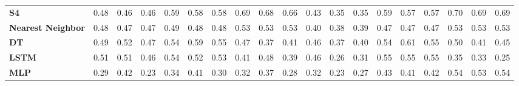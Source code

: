 \begin{table}[t]
{\begin{tabular}{l ccc ccc ccc ccc ccc ccc}
\textbf{S4} & \cellcolor[HTML]{FFCD3E}0.48 & \cellcolor[HTML]{FFC442}0.46 & \cellcolor[HTML]{FFC442}0.46 & \cellcolor[HTML]{BDD24B}0.59 & \cellcolor[HTML]{C5D249}0.58 & \cellcolor[HTML]{C4D24A}0.58 & \cellcolor[HTML]{7BD05C}0.69 & \cellcolor[HTML]{82D05A}0.68 & \cellcolor[HTML]{92D156}0.66 & \cellcolor[HTML]{FFB649}0.43 & \cellcolor[HTML]{FF9458}0.35 & \cellcolor[HTML]{FF9558}0.35 & \cellcolor[HTML]{C4D24A}0.59 & \cellcolor[HTML]{D2D346}0.57 & \cellcolor[HTML]{D1D346}0.57 & \cellcolor[HTML]{75D05D}0.70 & \cellcolor[HTML]{78D05C}0.69 & \cellcolor[HTML]{79D05C}0.69 \\
\textbf{Nearest Neighbor} & \cellcolor[HTML]{FFCA3F}0.48 & \cellcolor[HTML]{FFC741}0.47 & \cellcolor[HTML]{FFC840}0.47 & \cellcolor[HTML]{FFCF3D}0.49 & \cellcolor[HTML]{FFCD3E}0.48 & \cellcolor[HTML]{FFCD3E}0.48 & \cellcolor[HTML]{EAD340}0.53 & \cellcolor[HTML]{E9D340}0.53 & \cellcolor[HTML]{ECD340}0.53 & \cellcolor[HTML]{FFA84F}0.40 & \cellcolor[HTML]{FFA252}0.38 & \cellcolor[HTML]{FFA451}0.39 & \cellcolor[HTML]{FFC641}0.47 & \cellcolor[HTML]{FFC841}0.47 & \cellcolor[HTML]{FFC542}0.47 & \cellcolor[HTML]{EAD340}0.53 & \cellcolor[HTML]{E8D341}0.53 & \cellcolor[HTML]{EBD340}0.53 \\
\textbf{DT} & \cellcolor[HTML]{FFCF3D}0.49 & \cellcolor[HTML]{F2D43E}0.52 & \cellcolor[HTML]{FFC840}0.47 & \cellcolor[HTML]{E1D343}0.54 & \cellcolor[HTML]{BED24B}0.59 & \cellcolor[HTML]{DDD343}0.55 & \cellcolor[HTML]{FFC840}0.47 & \cellcolor[HTML]{FF9D54}0.37 & \cellcolor[HTML]{FFAD4D}0.41 & \cellcolor[HTML]{FFC542}0.46 & \cellcolor[HTML]{FF9D54}0.37 & \cellcolor[HTML]{FFA94F}0.40 & \cellcolor[HTML]{E5D341}0.54 & \cellcolor[HTML]{B3D24E}0.61 & \cellcolor[HTML]{DDD343}0.55 & \cellcolor[HTML]{FED43B}0.50 & \cellcolor[HTML]{FFB04B}0.41 & \cellcolor[HTML]{FFBF45}0.45 \\
\textbf{LSTM} & \cellcolor[HTML]{F6D43D}0.51 & \cellcolor[HTML]{F8D43D}0.51 & \cellcolor[HTML]{FFC442}0.46 & \cellcolor[HTML]{E6D341}0.54 & \cellcolor[HTML]{EED43F}0.52 & \cellcolor[HTML]{EDD33F}0.53 & \cellcolor[HTML]{FFAF4C}0.41 & \cellcolor[HTML]{FFCC3F}0.48 & \cellcolor[HTML]{FFA550}0.39 & \cellcolor[HTML]{FFC343}0.46 & \cellcolor[HTML]{FF7069}0.26 & \cellcolor[HTML]{FF855F}0.31 & \cellcolor[HTML]{DAD344}0.55 & \cellcolor[HTML]{DBD344}0.55 & \cellcolor[HTML]{E0D343}0.55 & \cellcolor[HTML]{FF9458}0.35 & \cellcolor[HTML]{FF8F5B}0.33 & \cellcolor[HTML]{FF6C6A}0.25 \\
\textbf{MLP} & \cellcolor[HTML]{FF7A64}0.29 & \cellcolor[HTML]{FFB24A}0.42 & \cellcolor[HTML]{FF6B6B}0.23 & \cellcolor[HTML]{FF905A}0.34 & \cellcolor[HTML]{FFAF4C}0.41 & \cellcolor[HTML]{FF7F62}0.30 & \cellcolor[HTML]{FF875E}0.32 & \cellcolor[HTML]{FF9F53}0.37 & \cellcolor[HTML]{FF7766}0.28 & \cellcolor[HTML]{FF865F}0.32 & \cellcolor[HTML]{FF6B6B}0.23 & \cellcolor[HTML]{FF7268}0.27 & \cellcolor[HTML]{FFB748}0.43 & \cellcolor[HTML]{FFB04B}0.41 & \cellcolor[HTML]{FFB24B}0.42 & \cellcolor[HTML]{E5D341}0.54 & \cellcolor[HTML]{E8D341}0.53 & \cellcolor[HTML]{E7D341}0.54 \\

\end{tabular}}
\end{table}
